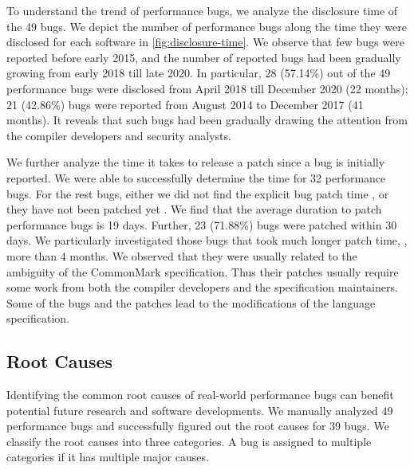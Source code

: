 To understand the trend of performance bugs, we analyze the disclosure time of the 49 bugs.
%
We depict the number of performance bugs along the time they were disclosed for each software in \autoref{fig:disclosure-time}.
%
%
%
We observe that few bugs were reported before early 2015, and the number of reported bugs had been gradually growing from early 2018 till late 2020.
%
In particular, 28 (57.14\%) out of the 49 performance bugs were disclosed from April 2018 till December 2020 (22 months);
%
21 (42.86\%) bugs were reported from August 2014 to December 2017 (41 months).
%
It reveals that such bugs had been gradually drawing the attention from the compiler developers and security analysts.
%

We further analyze the time it takes to release a patch since a bug is initially reported.
%
We were able to successfully determine the time for 32 performance bugs.
%
For the rest bugs, either we did not find the explicit bug patch time \cite{cmark-218}, or they have not been patched yet \cite{cmark-373}.
%
We find that the average duration to patch performance bugs is 19 days.
%
Further, 23 (71.88\%) bugs were patched within 30 days.
%
We particularly investigated those bugs that took much longer patch time, \eg{}, more than 4 months.
%
We observed that they were usually related to the ambiguity of the CommonMark specification.
%
Thus their patches usually require some work from both the compiler developers and the specification maintainers.
%
Some of the bugs and the patches lead to the modifications of the language specification.


\subsection{Root Causes}
\label{s:study-root-causes}
%
Identifying the common root causes of real-world performance bugs can benefit potential future research and software developments.
%
We manually analyzed 49 performance bugs and successfully figured out the root causes for 39 bugs.
%
We classify the root causes into three categories.
%
A bug is assigned to multiple categories if it has multiple major causes.


